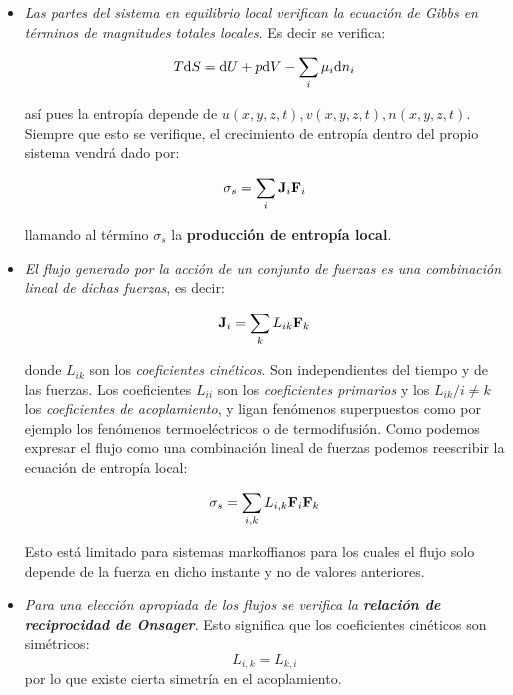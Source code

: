 \documentclass[12pt,a4paper,oneside]{book}
\begin{document}
\begin{itemize}
\item \textit{Las partes del sistema en equilibrio local verifican la ecuación de Gibbs en términos de magnitudes totales locales}. Es decir se verifica:

\begin{equation}
T \mathrm{d} S = \mathrm{d} U + p \mathrm{d} V - \sum_i \mu_i \mathrm{d} n_i \label{ec:5.2-001}
\end{equation}

así pues la entropía depende de $u(x,y,z,t), v(x,y,z,t), n(x,y,z,t)$. Siempre que esto se verifique, el crecimiento de entropía dentro del propio sistema vendrá dado por:

\begin{equation}
\sigma_s = \sum_i \textbf{J}_i \textbf{F}_i
\end{equation}

llamando al término $\sigma_s$ la \textbf{producción de entropía local}.


\item \textit{El flujo generado por la acción de un conjunto de fuerzas es una combinación lineal de dichas fuerzas}, es decir:

\begin{equation}
\textbf{J}_i = \sum_{k} L_{ik} \textbf{F}_{k}
\end{equation}

donde $L_{ik}$ son los \textit{coeficientes cinéticos}. Son independientes del tiempo y de las fuerzas. Los coeficientes $L_{ii}$ son los \textit{coeficientes primarios} y los $L_{ik} / i \neq k$ los \textit{coeficientes de acoplamiento}, y ligan fenómenos superpuestos como por ejemplo los fenómenos termoeléctricos o de termodifusión. Como podemos expresar el flujo como una combinación lineal de fuerzas podemos reescribir la ecuación de entropía local:

\begin{equation}
\sigma_s  = \sum_{i,k} L_{i,k} \textbf{F}_i \textbf{F}_k
\end{equation}

Esto está limitado para sistemas markoffianos para los cuales el flujo solo depende de la fuerza en dicho instante y no de valores anteriores.

\item \textit{Para una elección apropiada de los flujos se verifica la \textbf{relación de reciprocidad de Onsager}}. Esto significa que los coeficientes cinéticos son simétricos: 
\begin{equation}
L_{i,k} = L_{k,i}
\end{equation}
por lo que existe cierta simetría en el acoplamiento. 
\end{itemize}
 
\end{document}
